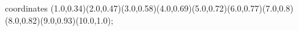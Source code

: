 					coordinates { (1.0,0.34)(2.0,0.47)(3.0,0.58)(4.0,0.69)(5.0,0.72)(6.0,0.77)(7.0,0.8)(8.0,0.82)(9.0,0.93)(10.0,1.0)};